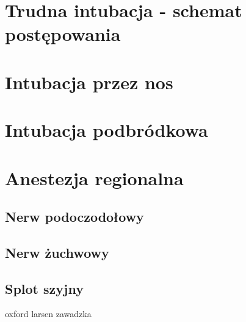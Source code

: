 \documentclass[a4paper, 12pt]{report}
\begin{document}
\section{Trudna intubacja - schemat postępowania}
\section{Intubacja przez nos}
\section{Intubacja podbródkowa}
\section{Anestezja regionalna}
\subsection{Nerw podoczodołowy}
\subsection{Nerw żuchwowy}
\subsection{Splot szyjny}

\begin{thebibliography}{99}
 oxford
 larsen
 zawadzka
\end{thebibliography}
\end{document}
